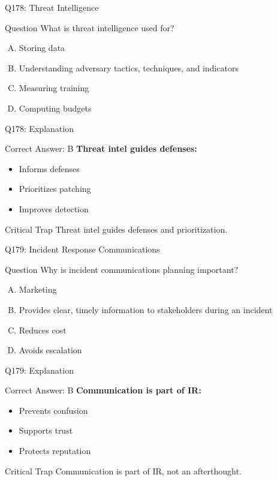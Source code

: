 \documentclass{beamer}
\begin{document}
	\begin{frame}{Q178: Threat Intelligence}
		\begin{block}{Question}
			What is threat intelligence used for?
		\end{block}
		\begin{enumerate}[(A)]
			\item Storing data
			\item Understanding adversary tactics, techniques, and indicators
			\item Measuring training
			\item Computing budgets
		\end{enumerate}
	\end{frame}
	
	\begin{frame}{Q178: Explanation}
		\begin{block}{Correct Answer: B}
			\textbf{Threat intel guides defenses:}
			\begin{itemize}
				\item Informs defenses
				\item Prioritizes patching
				\item Improves detection
			\end{itemize}
		\end{block}
		\begin{alertblock}{Critical Trap}
			Threat intel guides defenses and prioritization.
		\end{alertblock}
	\end{frame}
	
	\begin{frame}{Q179: Incident Response Communications}
		\begin{block}{Question}
			Why is incident communications planning important?
		\end{block}
		\begin{enumerate}[(A)]
			\item Marketing
			\item Provides clear, timely information to stakeholders during an incident
			\item Reduces cost
			\item Avoids escalation
		\end{enumerate}
	\end{frame}
	
	\begin{frame}{Q179: Explanation}
		\begin{block}{Correct Answer: B}
			\textbf{Communication is part of IR:}
			\begin{itemize}
				\item Prevents confusion
				\item Supports trust
				\item Protects reputation
			\end{itemize}
		\end{block}
		\begin{alertblock}{Critical Trap}
			Communication is part of IR, not an afterthought.
		\end{alertblock}
	\end{frame}
	
\end{document}
